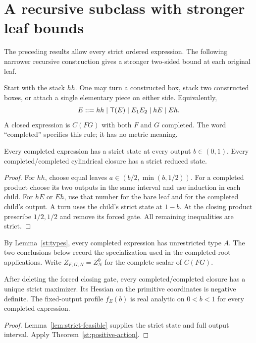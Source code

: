 \section{A recursive subclass with stronger leaf bounds}\label{nt:completed}
The preceding results allow every strict ordered expression. The
following narrower recursive construction gives a stronger two-sided
bound at each original leaf.

\begin{definition}\label{def:grammar}
Start with the stack $hh$. One may turn a constructed box, stack two
constructed boxes, or attach a single elementary piece on either side.
Equivalently,
\[
 E::=hh\mid\mathsf T(E)\mid E_1E_2\mid hE\mid Eh.
\]
A closed expression is $C(FG)$ with both $F$ and $G$ completed.
The word ``completed'' specifies this rule; it has no metric meaning.
\end{definition}

\begin{lemma}\label{lem:strict-feasible}
Every completed expression has a strict state at every output $b\in(0,1)$. Every completed/completed cylindrical closure has a strict reduced state.
\end{lemma}
\begin{proof}
For $hh$, choose equal leaves $a\in(b/2,\min(b,1/2))$. For a completed product choose its two outputs in the same interval and use induction in each child. For $hE$ or $Eh$, use that number for the bare leaf and for the completed child's output. A turn uses the child's strict state at $1-b$. At the closing product prescribe $1/2,1/2$ and remove its forced gate. All remaining inequalities are strict.
\end{proof}

By Lemma~\ref{st:types}, every completed expression has unrestricted
type $A$. The two conclusions below record the specialization used in
the completed-root applications. Write $Z_{F,G,N}=Z_N^0$ for the
complete scalar of $C(FG)$.

\begin{proposition}\label{prop:strict-maximum}
After deleting the forced closing gate, every completed/completed
closure has a unique strict maximizer. Its Hessian on the primitive
coordinates is negative definite. The fixed-output profile $f_E(b)$
is real analytic on $0<b<1$ for every completed expression.
\end{proposition}
\begin{proof}
Lemma~\ref{lem:strict-feasible} supplies the strict state and full
output interval. Apply Theorem~\ref{st:positive-action}.
\end{proof}


